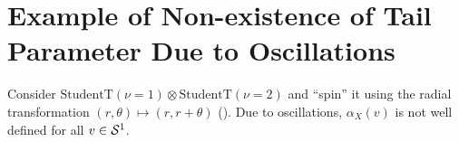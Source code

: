 \documentclass[nohyperref]{article}
\theoremstyle{plain}
\theoremstyle{definition}
\theoremstyle{remark}
\begin{document}

  


\section{Example of Non-existence of Tail Parameter Due to Oscillations}
\label{eg:spiral}

Consider $\text{StudentT}(\nu=1) \otimes \text{StudentT}(\nu=2)$ and ``spin'' it
using the radial transformation $(r,\theta) \mapsto (r,r+\theta)$ (). Due to
oscillations, $\alpha_X(v)$ is not well defined for all $v \in \mathcal{S}^{1}$.
\end{document}
